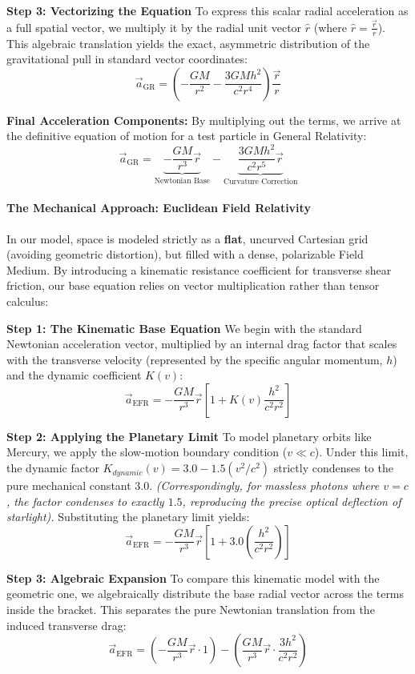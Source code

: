 \documentclass[twocolumn]{article}
\begin{document}
\textbf{Step 3: Vectorizing the Equation} To express this scalar radial
acceleration as a full spatial vector, we multiply it by the radial unit
vector \(\hat{r}\) (where \(\hat{r} = \frac{\vec{r}}{r}\)). This
algebraic translation yields the exact, asymmetric distribution of the
gravitational pull in standard vector coordinates:
\[\vec{a}_{\text{GR}} = \left( -\frac{GM}{r^2} - \frac{3GMh^2}{c^2r^4} \right) \frac{\vec{r}}{r}\]

\textbf{Final Acceleration Components:} By multiplying out the terms, we
arrive at the definitive equation of motion for a test particle in
General Relativity:
\[\vec{a}_{\text{GR}} = \underbrace{-\frac{GM}{r^3}\vec{r}}_{\text{Newtonian Base}} - \underbrace{\frac{3GMh^2}{c^2 r^5}\vec{r}}_{\text{Curvature Correction}}\]

\paragraph{The Mechanical Approach: Euclidean Field
Relativity}\label{the-mechanical-approach-euclidean-field-relativity}

In our model, space is modeled strictly as a \textbf{flat}, uncurved
Cartesian grid (avoiding geometric distortion), but filled with a dense,
polarizable Field Medium. By introducing a kinematic resistance
coefficient for transverse shear friction, our base equation relies on
vector multiplication rather than tensor calculus:

\textbf{Step 1: The Kinematic Base Equation} We begin with the standard
Newtonian acceleration vector, multiplied by an internal drag factor
that scales with the transverse velocity (represented by the specific
angular momentum, \(h\)) and the dynamic coefficient \(K(v)\):
\[\vec{a}_{\text{EFR}} = -\frac{GM}{r^3}\vec{r} \left[ 1 + K(v) \frac{h^2}{c^2 r^2} \right]\]

\textbf{Step 2: Applying the Planetary Limit} To model planetary orbits
like Mercury, we apply the slow-motion boundary condition (\(v \ll c\)).
Under this limit, the dynamic factor
\(K_{dynamic}(v) = 3.0 - 1.5(v^2/c^2)\) strictly condenses to the pure
mechanical constant \(3.0\). \emph{(Correspondingly, for massless
photons where \(v = c\), the factor condenses to exactly \(1.5\),
reproducing the precise optical deflection of starlight).} Substituting
the planetary limit yields:
\[\vec{a}_{\text{EFR}} = -\frac{GM}{r^3}\vec{r} \left[ 1 + 3.0 \left(\frac{h^2}{c^2 r^2}\right) \right]\]

\textbf{Step 3: Algebraic Expansion} To compare this kinematic model
with the geometric one, we algebraically distribute the base radial
vector across the terms inside the bracket. This separates the pure
Newtonian translation from the induced transverse drag:
\[\vec{a}_{\text{EFR}} = \left( -\frac{GM}{r^3}\vec{r} \cdot 1 \right) - \left( \frac{GM}{r^3}\vec{r} \cdot \frac{3h^2}{c^2 r^2} \right)\]
\end{document}

